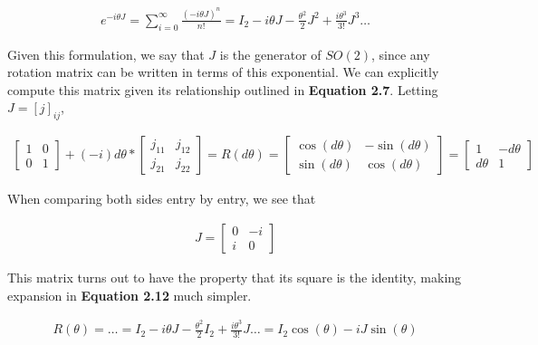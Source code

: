 \documentclass[10pt]{ucthesis}
\begin{document}
\begin{equation}
	\begin{aligned}
		e^{-i\theta J} = \sum_{i=0}^\infty \frac{\left(-i\theta J\right)^n}{n!} = I_2 -i\theta J - \frac{\theta^2}{2} J^2 + \frac{i\theta^3}{3!}J^3 \hdots 
	\end{aligned}
\end{equation}  

Given this formulation, we say that $J$ is the generator of $SO(2)$, since any rotation matrix can be written in terms of this exponential. We can explicitly compute this matrix given its relationship outlined in \textbf{Equation 2.7}. Letting $J = [j]_{ij}$,

\begin{equation}
	\begin{aligned}
		\begin{bmatrix}
			1 & 0 \\
			0 & 1
		\end{bmatrix} + (-i)d\theta * \begin{bmatrix}
			j_{11} & j_{12} \\
			j_{21} & j_{22}
		\end{bmatrix} = R(d\theta) = \begin{bmatrix}
			\cos(d\theta) & -\sin(d\theta) \\
			\sin(d\theta) & \cos(d\theta)
		\end{bmatrix} = 
		\begin{bmatrix}
			1 & -d\theta \\
			d\theta & 1
		\end{bmatrix}
	\end{aligned}
\end{equation}

When comparing both sides entry by entry, we see that 

\begin{equation}
	\begin{aligned}
		J = \begin{bmatrix}
			0 & -i \\
			i & 0
		\end{bmatrix}
	\end{aligned}
\end{equation}

This matrix turns out to have the property that its square is the identity, making expansion in \textbf{Equation 2.12} much simpler.

\begin{equation}
	\begin{aligned}
		R(\theta) = \hdots = I_2 -i\theta J - \frac{\theta^2}{2} I_2 + \frac{i\theta^3}{3!}J \hdots = I_2 \cos(\theta) -iJ \sin(\theta) 
	\end{aligned}
\end{equation}
\end{document}
